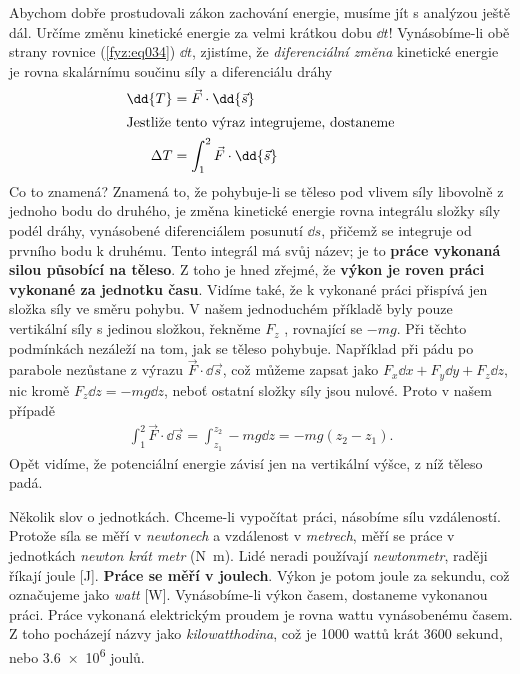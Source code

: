     Abychom dobře prostudovali zákon zachování energie, musíme jít s analýzou ještě dál. Určíme 
    změnu kinetické energie za velmi krátkou dobu \(\dd{t}\)! Vynásobíme-li obě strany rovnice 
    (\ref{fyz:eq034}) \(\dd{t}\), zjistíme, že \emph{diferenciální změna} kinetické energie je 
    rovna skalárnímu součinu síly a diferenciálu dráhy
    \begin{align}
      \dd{T}    &= \vec{F}\cdot\dd{\vec{s}}              \label{fyz:eq035} \\
      \shortintertext{Jestliže tento výraz integrujeme, dostaneme}
      \Delta T  &= \int_{1}^{2}\vec{F}\cdot\dd{\vec{s}}  \label{fyz:eq036}
    \end{align}
    Co to znamená? Znamená to, že pohybuje-li se těleso pod vlivem síly libovolně z jednoho bodu do 
    druhého, je změna kinetické energie rovna integrálu složky síly podél dráhy, vynásobené 
    diferenciálem posunutí \(\dd{s}\), přičemž se integruje od prvního bodu k druhému. Tento 
    integrál má svůj název; je to \textbf{práce vykonaná silou působící na těleso}. Z toho je hned 
    zřejmé, že \textbf{výkon je roven práci vykonané za jednotku času}. Vidíme také, že k vykonané 
    práci přispívá jen složka síly ve směru pohybu. V našem jednoduchém příkladě byly pouze 
    vertikální síly s jedinou složkou, řekněme \(F_z\) , rovnající se \(- mg\). Při těchto 
    podmínkách nezáleží na tom, jak se těleso pohybuje. Například při pádu po parabole nezůstane z 
    výrazu \(\vec{F}\cdot\dd{\vec{s}}\), což můžeme zapsat jako \(F_x\dd{x} + F_y\dd{y} + 
    F_z\dd{z}\), nic kromě \(F_z\dd{z}=-mg\dd{z}\), neboť ostatní složky síly jsou nulové. Proto v 
    našem případě
    \begin{align}
      \int_{1}^{2}\vec{F}\cdot\dd{\vec{s}} = 
      \int_{z_1}^{z_2}-mg\dd{z} = 
      -mg(z_2 - z_1). \label{fyz:eq037}
    \end{align}
    Opět vidíme, že potenciální energie závisí jen na vertikální výšce, z níž těleso padá.
    
    Několik slov o jednotkách. Chceme-li vypočítat práci, násobíme sílu vzdáleností. Protože síla 
    se měří v \emph{newtonech} a vzdálenost v \emph{metrech}, měří se práce v jednotkách 
    \emph{newton krát metr} (\unit{\newton\meter}). Lidé neradi používají \emph{newtonmetr}, raději 
    říkají joule [\unit{\joule}]. \textbf{Práce se měří v joulech}. Výkon je potom joule za sekundu, 
    což označujeme jako \emph{watt} [\unit{\watt}]. Vynásobíme-li výkon časem, dostaneme vykonanou 
    práci. Práce vykonaná elektrickým proudem je rovna wattu vynásobenému časem. Z toho pocházejí 
    názvy jako \emph{kilowatthodina}, což je \num{1000} wattů krát \num{3600} sekund, nebo 
    \num{3.6e6} joulů.
    
